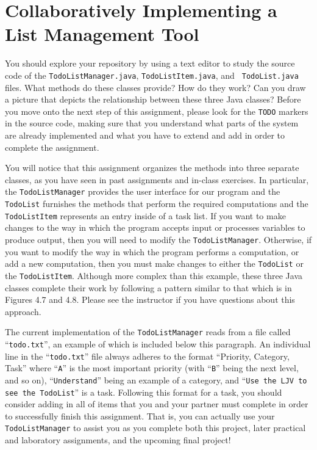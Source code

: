 \documentclass[11pt]{article}
\newcommand{\program}[1]{\lstinline{#1}}
\begin{document}
\section*{Collaboratively Implementing a List Management Tool}

You should explore your repository by using a text editor to study the source
code of the {\tt TodoListManager.java}, {\tt TodoListItem.java}, and {\tt
TodoList.java} files. What methods do these classes provide? How do they work?
Can you draw a picture that depicts the relationship between these three Java
classes? Before you move onto the next step of this assignment, please look for
the \program{TODO} markers in the source code, making sure that you understand
what parts of the system are already implemented and what you have to extend and
add in order to complete the assignment.

You will notice that this assignment organizes the methods into three separate classes, as you have seen in past
assignments and in-class exercises. In particular, the {\tt TodoListManager} provides the user interface for our program
and the {\tt TodoList} furnishes the methods that perform the required computations and the {\tt TodoListItem}
represents an entry inside of a task list. If you want to make changes to the way in which the program accepts input or
processes variables to produce output, then you will need to modify the {\tt TodoListManager}. Otherwise, if you want to
modify the way in which the program performs a computation, or add a new computation, then you must make changes to
either the {\tt TodoList} or the {\tt TodoListItem}. Although more complex than this example, these three Java classes
complete their work by following a pattern similar to that which is in Figures 4.7 and 4.8. Please see the instructor if
you have questions about this approach.

The current implementation of the {\tt TodoListManager} reads from a file called ``{\tt todo.txt}'', an example of which
is included below this paragraph. An individual line in the ``{\tt todo.txt}'' file always adheres to the format
``Priority, Category, Task'' where ``{\tt A}'' is the most important priority (with ``{\tt B}'' being the next level,
and so on), ``{\tt Understand}'' being an example of a category, and ``{\tt Use the LJV to see the TodoList}'' is a
task.  Following this format for a task, you should consider adding in all of items that you and your partner must
complete in order to successfully finish this assignment. That is, you can actually use your {\tt TodoListManager} to
assist you as you complete both this project, later practical and laboratory assignments, and the upcoming final
project!
\end{document}
